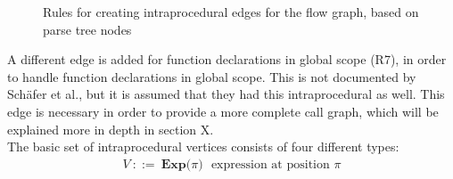 \documentclass[journal,10pt]{IEEEtran}
\begin{document}
\begin{figure}[H]
\hspace*{-.4cm}
\caption{Rules for creating intraprocedural edges for the flow graph, based on parse tree nodes}
\end{figure}

A different edge is added for function declarations in global scope (R7), in order to handle function declarations in global scope. This is not documented by Sch\"{a}fer et al., but it is assumed that they had this intraprocedural as well. This edge is necessary in order to provide a more complete call graph, which will be explained more in depth in section X. \\ %

The basic set of intraprocedural vertices consists of four different types:
\begin{equation*}
\begin{aligned}
V~::=~\textbf{Exp($\pi$)}~~~\text{expression at position $\pi$}
\end{aligned}
\end{equation*}
\end{document}
